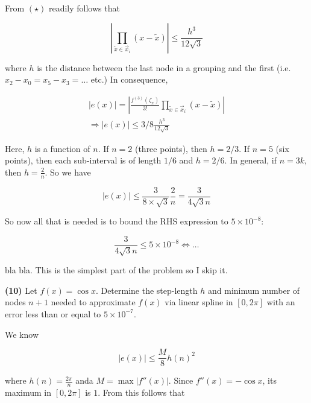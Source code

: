 \documentclass[12pt]{article}
\theoremstyle{definition}
\begin{document}
From $( \star )$ readily follows that 

\begin{equation*}
    \left| \prod_{\widetilde{ x } \in \overrightarrow{x}_i }(x-\widetilde{ x } )
    \right| \leq \frac{ h^3 }{12\sqrt{3} }
\end{equation*}

where $h$ is the distance between the last node in a grouping and the first
(i.e. $x_2 - x_0 = x_5 - x_3 = \ldots$ etc.) In consequence, 


\begin{align*}
    \left| e(x) \right| = \left|\frac{ f^{(3)}(\zeta_x) }{3!}\prod_{\widetilde{ x }
    \in \overrightarrow{x}_i } (x-\widetilde{ x } )\right| \\ 
    \Rightarrow \left| e(x) \right| \leq  3 / 8 \frac{h^3}{12\sqrt{3} }
\end{align*}

Here, $h$ is a function of $n$. If $n = 2$ (three points), then $h = 2/3$.
If $n = 5$ (six points), then each sub-interval is of length $1 / 6$ and $h =
2/6$. In general, if $n = 3k$, then $h = \frac{2}{n}$. So we have 

\begin{equation*}
    \left| e(x) \right|  \leq \frac{ 3 }{8\times \sqrt{3} } \frac{2}{n} =
    \frac{3}{4\sqrt{3}n }
\end{equation*}

So now all that is needed is to bound the RHS expression to $5 \times 10^{-8}$:

\begin{equation*}
    \frac{3}{4\sqrt{3}n } \leq 5\times 10^{-8} \iff \ldots
\end{equation*}

bla bla. This is the simplest part of the problem so I skip it.

\pagebreak 

\begin{shaded}
    \textbf{(10)} Let $f(x) = \cos x$. Determine the step-length $h$ and minimum
    number of nodes $n+1$ needed to approximate $f(x)$ via linear spline in $[0,
    2\pi]$ with an error less than or equal to $5 \times 10^{-7}$.
\end{shaded}

We know 

\begin{equation*}
    \left| e(x) \right| \leq \frac{M}{8}h(n)^2
\end{equation*}

where $h(n) = \frac{2\pi}{n}$ anda $M = \max \left| f''(x) \right| $. Since
$f''(x) = -\cos x$, its maximum in $[0, 2\pi]$ is $1$. From this follows that 
\end{document}
